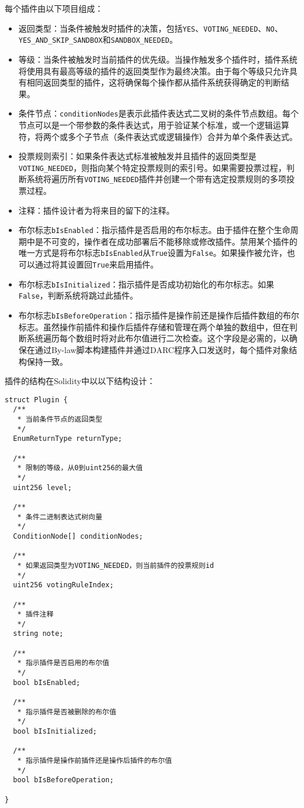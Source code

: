 \documentclass[main.tex]{subfiles}
\begin{document}
每个插件由以下项目组成：
\begin{itemize}
\item 返回类型：当条件被触发时插件的决策，包括\texttt{YES}、\texttt{VOTING\_NEEDED}、\texttt{NO}、\texttt{YES\_AND\_SKIP\_SANDBOX}和\texttt{SANDBOX\_NEEDED}。
\item 等级：当条件被触发时当前插件的优先级。当操作触发多个插件时，插件系统将使用具有最高等级的插件的返回类型作为最终决策。由于每个等级只允许具有相同返回类型的插件，这将确保每个操作都从插件系统获得确定的判断结果。
\item 条件节点：\texttt{conditionNodes}是表示此插件表达式二叉树的条件节点数组。每个节点可以是一个带参数的条件表达式，用于验证某个标准，或一个逻辑运算符，将两个或多个子节点（条件表达式或逻辑操作）合并为单个条件表达式。
\item 投票规则索引：如果条件表达式标准被触发并且插件的返回类型是\texttt{VOTING\_NEEDED}，则指向某个特定投票规则的索引号。如果需要投票过程，判断系统将遍历所有\texttt{VOTING\_NEEDED}插件并创建一个带有选定投票规则的多项投票过程。
\item 注释：插件设计者为将来目的留下的注释。
\item 布尔标志\texttt{bIsEnabled}：指示插件是否启用的布尔标志。由于插件在整个生命周期中是不可变的，操作者在成功部署后不能移除或修改插件。禁用某个插件的唯一方式是将布尔标志\texttt{bIsEnabled}从\texttt{True}设置为\texttt{False}。如果操作被允许，也可以通过将其设置回\texttt{True}来启用插件。
\item 布尔标志\texttt{bIsInitialized}：指示插件是否成功初始化的布尔标志。如果\texttt{False}，判断系统将跳过此插件。
\item 布尔标志\texttt{bIsBeforeOperation}：指示插件是操作前还是操作后插件数组的布尔标志。虽然操作前插件和操作后插件存储和管理在两个单独的数组中，但在判断系统遍历每个数组时将对此布尔值进行二次检查。这个字段是必需的，以确保在通过By-law脚本构建插件并通过DARC程序入口发送时，每个插件对象结构保持一致。

\end{itemize}


插件的结构在Solidity中以以下结构设计：

\begin{verbatim}
struct Plugin {
  /**
   * 当前条件节点的返回类型
   */
  EnumReturnType returnType;

  /**
   * 限制的等级，从0到uint256的最大值
   */
  uint256 level;

  /**
   * 条件二进制表达式树向量
   */
  ConditionNode[] conditionNodes;

  /**
   * 如果返回类型为VOTING_NEEDED，则当前插件的投票规则id
   */
  uint256 votingRuleIndex;

  /**
   * 插件注释
   */
  string note;

  /**
   * 指示插件是否启用的布尔值
   */
  bool bIsEnabled;

  /**
   * 指示插件是否被删除的布尔值
   */
  bool bIsInitialized;

  /**
   * 指示插件是操作前插件还是操作后插件的布尔值
   */
  bool bIsBeforeOperation;
  
}
\end{verbatim}
\end{document}
